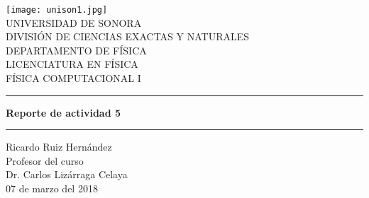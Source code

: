 \documentclass{article}
\begin{document}
\begin{center}
\texttt{[image: unison1.jpg]}
\\
\vspace{0.5cm}
UNIVERSIDAD DE SONORA \\
\vspace{0.5cm}
DIVISIÓN DE CIENCIAS EXACTAS Y NATURALES \\
\vspace{0.5cm}
DEPARTAMENTO DE FÍSICA\\
\vspace{0.5cm}
LICENCIATURA EN FÍSICA\\
\vspace{0.5cm}
FÍSICA COMPUTACIONAL I
\vspace{2 cm}
\hrule
\vspace{1 cm}

{\huge \bfseries {Reporte de actividad 5}}
\\
\vspace{1 cm}
\hrule
\vspace{2 cm}
Ricardo Ruiz Hernández\\ 
\vspace{1 cm}
Profesor del curso\\
Dr. Carlos Lizárraga Celaya\\
\vspace{2 cm}
07 de marzo del 2018
\end{center}
\end{document}
